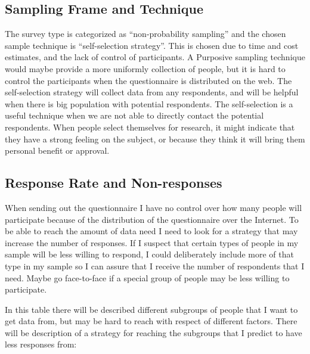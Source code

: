   \subsection{Sampling Frame and Technique}

    
    The survey type is categorized as ``non-probability sampling'' and the chosen sample technique is ``self-selection strategy''. This is chosen due to time and cost estimates, and the lack of control of participants. A Purposive sampling technique would maybe provide a more uniformly collection of people, but it is hard to control the participants when the questionnaire is distributed on the web. The self-selection strategy will collect data from any respondents, and will be helpful when there is big population with potential respondents. The self-selection is a useful technique when we are not able to directly contact the potential respondents. When people select themselves for research, it might indicate that they have a strong feeling on the subject, or because they think it will bring them personal benefit or approval. 

  \subsection{Response Rate and Non-responses}

    When sending out the questionnaire I have no control over how many people will participate because of the distribution of the questionnaire over the Internet. To be able to reach the amount of data need I need to look for a strategy that may increase the number of responses. If I suspect that certain types of people in my sample will be less willing to respond, I could deliberately include more of that type in my sample so I can assure that I receive the number of respondents that I need. Maybe go face-to-face if a special group of people may be less willing to participate. 

    In this table there will be described different subgroups of people that I want to get data from, but may be hard to reach with respect of different factors. There will be description of a strategy for reaching the subgroups that I predict to have less responses from:


